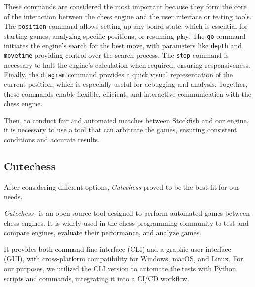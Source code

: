 \vspace{1em}

\noindent These commands are considered the most important because they form the core of the interaction between the chess engine and the user interface or testing tools. The \texttt{position} command allows setting up any board state, which is essential for starting games, analyzing specific positions, or resuming play. The \texttt{go} command initiates the engine's search for the best move, with parameters like \texttt{depth} and \texttt{movetime} providing control over the search process. The \texttt{stop} command is necessary to halt the engine's calculation when required, ensuring responsiveness. Finally, the \texttt{diagram} command provides a quick visual representation of the current position, which is especially useful for debugging and analysis. Together, these commands enable flexible, efficient, and interactive communication with the chess engine.

\vspace{1em}

\noindent Then, to conduct fair and automated matches between Stockfish and our engine, it is necessary to use a tool that can arbitrate the games, ensuring consistent conditions and accurate results.

\subsection{Cutechess}

\noindent After considering different options, \textit{Cutechess} proved to be the best fit for our needs.

\vspace{1em}

\noindent \textit{Cutechess}~\cite{CuteChess} is an open-source tool designed to perform automated games between chess engines. It is widely used in the chess programming community to test and compare engines, evaluate their performance, and analyze games.

\vspace{1em}

\noindent It provides both command-line interface (CLI) and a graphic user interface (GUI), with cross-platform compatibility for Windows, macOS, and Linux. For our purposes, we utilized the CLI version to automate the tests with Python scripts and commands, integrating it into a CI/CD workflow.

\vspace{1em}


